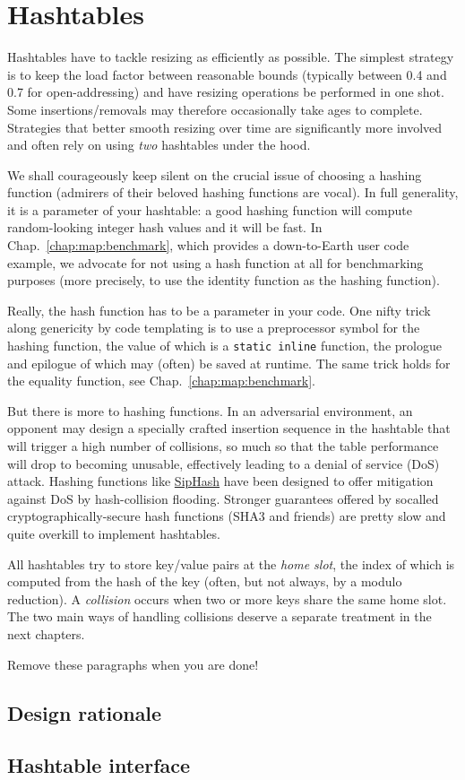 \chapter{Hashtables}\label{chap:hashtables}

Hashtables have to tackle resizing as efficiently as possible. The simplest strategy is to keep the load factor between reasonable bounds (typically between 0.4 and 0.7 for open-addressing) and have resizing operations be performed in one shot. Some insertions/removals may therefore occasionally take ages to complete. Strategies that better smooth resizing over time are significantly more involved and often rely on using \textit{two} hashtables under the hood.

We shall courageously keep silent on the crucial issue of choosing a hashing function (admirers of their beloved hashing functions are vocal). In full generality, it is a parameter of your hashtable: a good hashing function will compute random-looking integer hash values and it will be fast. In Chap.~\ref{chap:map:benchmark}, which provides a down-to-Earth user code example, we advocate for not using a hash function at all for benchmarking purposes (more precisely, to use the identity function as the hashing function).

Really, the hash function has to be a parameter in your code. One nifty trick along genericity by code templating is to use a preprocessor symbol for the hashing function, the value of which is a \texttt{static inline} function, the prologue and epilogue of which may (often) be saved at runtime. The same trick holds for the equality function, see Chap.~\ref{chap:map:benchmark}. 

But there is more to hashing functions. In an adversarial environment, an opponent may design a specially crafted insertion sequence in the hashtable that will trigger a high number of collisions, so much so that the table performance will drop to becoming unusable, effectively leading to a denial of service (DoS) attack. Hashing functions like \href{https://en.wikipedia.org/wiki/SipHash}{SipHash} have been designed to offer mitigation against DoS by hash-collision flooding. Stronger guarantees offered by socalled cryptographically-secure hash functions (SHA3 and friends) are pretty slow and quite overkill to implement hashtables.

All hashtables try to store key/value pairs at the \textit{home slot}, the index of which is computed from the hash of the key (often, but not always, by a modulo reduction). A \textit{collision} occurs when two or more keys share the same home slot. The two main ways of handling collisions deserve a separate treatment in the next chapters. 

Remove these paragraphs when you are done!

\section{Design rationale}

\section{Hashtable interface}

